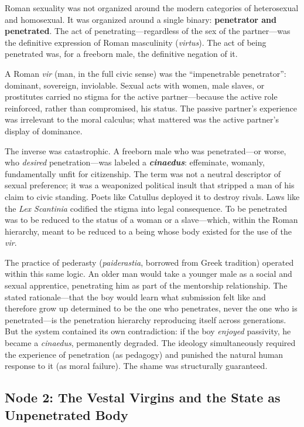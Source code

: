 \documentclass[12pt,openany]{book}
\begin{document}
Roman sexuality was not organized around the modern categories of heterosexual and homosexual. It was organized around a single binary: \textbf{penetrator and penetrated}. The act of penetrating---regardless of the sex of the partner---was the definitive expression of Roman masculinity (\textit{virtus}). The act of being penetrated was, for a freeborn male, the definitive negation of it.

A Roman \textit{vir} (man, in the full civic sense) was the ``impenetrable penetrator'': dominant, sovereign, inviolable. Sexual acts with women, male slaves, or prostitutes carried no stigma for the active partner---because the active role reinforced, rather than compromised, his status. The passive partner's experience was irrelevant to the moral calculus; what mattered was the active partner's display of dominance.

The inverse was catastrophic. A freeborn male who was penetrated---or worse, who \textit{desired} penetration---was labeled a \textbf{\textit{cinaedus}}: effeminate, womanly, fundamentally unfit for citizenship. The term was not a neutral descriptor of sexual preference; it was a weaponized political insult that stripped a man of his claim to civic standing. Poets like Catullus deployed it to destroy rivals. Laws like the \textit{Lex Scantinia} codified the stigma into legal consequence. To be penetrated was to be reduced to the status of a woman or a slave---which, within the Roman hierarchy, meant to be reduced to a being whose body existed for the use of the \textit{vir}.

The practice of pederasty (\textit{paiderastia}, borrowed from Greek tradition) operated within this same logic. An older man would take a younger male as a social and sexual apprentice, penetrating him as part of the mentorship relationship. The stated rationale---that the boy would learn what submission felt like and therefore grow up determined to be the one who penetrates, never the one who is penetrated---is the penetration hierarchy reproducing itself across generations. But the system contained its own contradiction: if the boy \textit{enjoyed} passivity, he became a \textit{cinaedus}, permanently degraded. The ideology simultaneously required the experience of penetration (as pedagogy) and punished the natural human response to it (as moral failure). The shame was structurally guaranteed.

\subsection{Node 2: The Vestal Virgins and the State as Unpenetrated Body}
\end{document}
